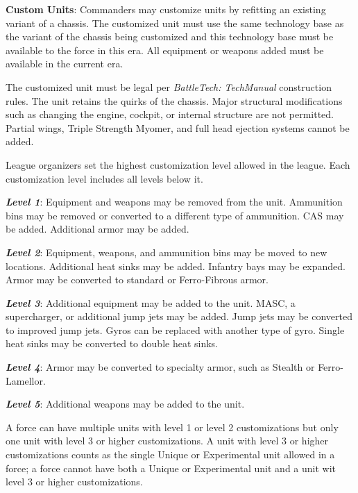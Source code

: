 \item {\bfseries Custom Units}: Commanders may customize units by refitting an existing variant of a chassis.
The customized unit must use the same technology base as the variant of the chassis being customized and this technology base must be available to the force in this era.
All equipment or weapons added must be available in the current era.

The customized unit must be legal per \emph{BattleTech: TechManual} construction rules.
The unit retains the quirks of the chassis.
Major structural modifications such as changing the engine, cockpit, or internal structure are not permitted.
Partial wings, Triple Strength Myomer, and full head ejection systems cannot be added.

League organizers set the highest customization level allowed in the league.
Each customization level includes all levels below it.

\begin{description}

\item \emph{\bfseries Level 1}: Equipment and weapons may be removed from the unit.
Ammunition bins may be removed or converted to a different type of ammunition.
CAS may be added.
Additional armor may be added.

\item \emph{\bfseries Level 2}: Equipment, weapons, and ammunition bins may be moved to new locations.
Additional heat sinks may be added.
Infantry bays may be expanded.
Armor may be converted to standard or Ferro-Fibrous armor.

\item \emph{\bfseries Level 3}: Additional equipment may be added to the unit. 
MASC, a supercharger, or additional jump jets may be added.
Jump jets may be converted to improved jump jets.
Gyros can be replaced with another type of gyro.
Single heat sinks may be converted to double heat sinks.

\item \emph{\bfseries Level 4}: Armor may be converted to specialty armor, such as Stealth or Ferro-Lamellor.

\item \emph{\bfseries Level 5}: Additional weapons may be added to the unit.

\end{description}

A force can have multiple units with level 1 or level 2 customizations but only one unit with level 3 or higher customizations.
A unit with level 3 or higher customizations counts as the single Unique or Experimental unit allowed in a force; a force cannot have both a Unique or Experimental unit and a unit wit level 3 or higher customizations.

